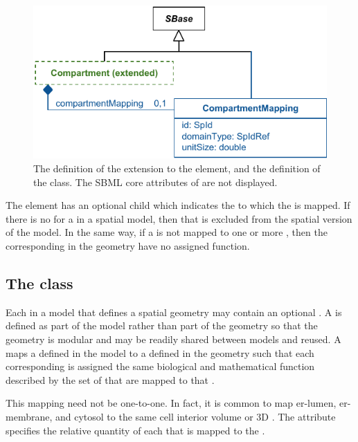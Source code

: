 \begin{figure}[ht]
  \includegraphics{figs/extended-compartment-uml}
  \caption{The definition of the extension to the \Compartment element, and the definition of the \CompartmentMapping class. The SBML core attributes of \Compartment are not displayed.}
  \label{compartment-uml}
  \label{CompartmentMapping-uml}
\end{figure}



The \Compartment element has an optional \CompartmentMapping child which indicates the \DomainType to which the \Compartment is mapped.  If there is no \CompartmentMapping for a \Compartment in a spatial model, then that \Compartment is excluded from the spatial version of the model.  In the same way, if a \DomainType is not mapped to one or more \Compartments, then the corresponding \Domains in the geometry have no assigned function.


\subsection{The  class}
\label{compartmentmapping-class}
Each \Compartment in a model that defines a spatial geometry may contain an optional \CompartmentMapping. A \CompartmentMapping is defined as part of the model rather than part of the geometry so that the geometry is modular and may be readily shared between models and reused.  A \CompartmentMapping maps a \Compartment defined in the model to a \DomainType defined in the geometry such that each corresponding \DomainType is assigned the same biological and mathematical function described by the set of \Compartments that are mapped to that \DomainType. 

This mapping need not be one-to-one.  In fact, it is common to map er-lumen, er-membrane, and cytosol to the same cell interior volume or 3D \DomainType.  The  attribute specifies the relative quantity of each \Compartment that is mapped to the \DomainType.

